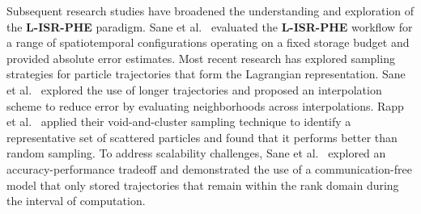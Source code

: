 Subsequent research studies have broadened the understanding and exploration of the \textbf{L-ISR-PHE} paradigm.
%
Sane et al.~\cite{sane2018revisiting} evaluated the \textbf{L-ISR-PHE} workflow for a range of spatiotemporal configurations operating on a fixed storage budget and provided absolute error estimates. 
%
Most recent research has explored sampling strategies for particle trajectories that form the Lagrangian representation.
%
Sane et al.~\cite{sane2019interpolation} explored the use of longer trajectories and 
%
proposed an interpolation scheme to reduce error by evaluating neighborhoods across interpolations.
%
Rapp et al.~\cite{rapp2019void} applied their void-and-cluster sampling technique to identify a representative set of scattered particles and found that it performs better than random sampling. 
%
To address scalability challenges, Sane et al.~\cite{sane2020scalable} explored an accuracy-performance tradeoff and demonstrated the use of a communication-free model that only stored trajectories that remain within the rank domain during the interval of computation.
%

%
%
%
%
%
%
%
%
%
%
%
%

